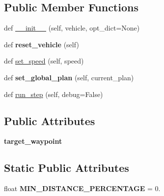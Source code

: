 \subsection*{Public Member Functions}
\begin{DoxyCompactItemize}
\item 
def \hyperlink{classscripts_1_1agents_1_1navigation_1_1local__planner_1_1LocalPlanner_a5b8240f8fa0bc5920546f2df4393e22d}{\+\_\+\+\_\+init\+\_\+\+\_\+} (self, vehicle, opt\+\_\+dict=None)
\item 
\mbox{\label{classscripts_1_1agents_1_1navigation_1_1local__planner_1_1LocalPlanner_ae32fe320ee612ab68c96eb7334786d59}} 
def {\bfseries reset\+\_\+vehicle} (self)
\item 
def \hyperlink{classscripts_1_1agents_1_1navigation_1_1local__planner_1_1LocalPlanner_a72967b7d87ed27590a5663d4904cc2d4}{set\+\_\+speed} (self, speed)
\item 
\mbox{\label{classscripts_1_1agents_1_1navigation_1_1local__planner_1_1LocalPlanner_acdb4899ec37d4431164c5a99f6e1a8ca}} 
def {\bfseries set\+\_\+global\+\_\+plan} (self, current\+\_\+plan)
\item 
def \hyperlink{classscripts_1_1agents_1_1navigation_1_1local__planner_1_1LocalPlanner_aed8c6636540d123d047ee1e71443ae20}{run\+\_\+step} (self, debug=False)
\end{DoxyCompactItemize}
\subsection*{Public Attributes}
\begin{DoxyCompactItemize}
\item 
\mbox{\label{classscripts_1_1agents_1_1navigation_1_1local__planner_1_1LocalPlanner_a5cbe3e6019aa2dd6813a966bf938ff94}} 
{\bfseries target\+\_\+waypoint}
\end{DoxyCompactItemize}
\subsection*{Static Public Attributes}
\begin{DoxyCompactItemize}
\item 
\mbox{\label{classscripts_1_1agents_1_1navigation_1_1local__planner_1_1LocalPlanner_ac00b6f71173ce35b08339a6f5b9142aa}} 
float {\bfseries M\+I\+N\+\_\+\+D\+I\+S\+T\+A\+N\+C\+E\+\_\+\+P\+E\+R\+C\+E\+N\+T\+A\+GE} = 0.
\end{DoxyCompactItemize}


